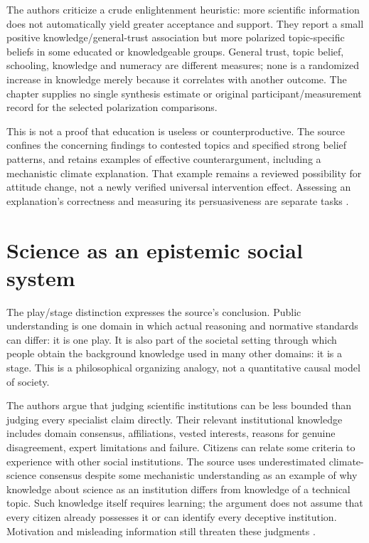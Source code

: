The authors criticize a crude enlightenment heuristic: more scientific
information does not automatically yield greater acceptance and support.
They report a small positive knowledge/general-trust association but
more polarized topic-specific beliefs in some educated or knowledgeable
groups. General trust, topic belief, schooling, knowledge and numeracy
are different measures; none is a randomized increase in knowledge merely
because it correlates with another outcome. The chapter supplies no
single synthesis estimate or original participant/measurement record
for the selected polarization comparisons.

This is not a proof that education is useless or counterproductive.
The source confines the concerning findings to contested topics and
specified strong belief patterns, and retains examples of effective
counterargument, including a mechanistic climate explanation. That
example remains a reviewed possibility for attitude change, not a
newly verified universal intervention effect. Assessing an explanation's
correctness and measuring its persuasiveness are separate tasks
\cite[p.~772]{BrommeGierth2021PublicScience}.

\section{Science as an epistemic social system}
\label{sec:p18-r143-stage}

The play/stage distinction expresses the source's conclusion. Public
understanding is one domain in which actual reasoning and normative
standards can differ: it is one play. It is also part of the societal
setting through which people obtain the background knowledge used
in many other domains: it is a stage. This is a philosophical organizing
analogy, not a quantitative causal model of society.

The authors argue that judging scientific institutions can be less bounded
than judging every specialist claim directly. Their relevant institutional
knowledge includes domain consensus, affiliations, vested interests,
reasons for genuine disagreement, expert limitations and failure. Citizens
can relate some criteria to experience with other social institutions.
The source uses underestimated climate-science consensus despite some
mechanistic understanding as an example of why knowledge about science
as an institution differs from knowledge of a technical topic.
Such knowledge itself requires learning; the argument does not assume
that every citizen already possesses it or can identify every deceptive
institution. Motivation and misleading information still threaten these
judgments \cite[pp.~772--773]{BrommeGierth2021PublicScience}.

